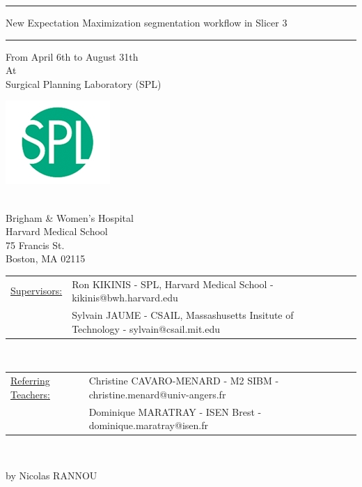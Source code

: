 \documentclass[a4paper,11pt]{report}
\begin{document}
\begin{titlepage}
\begin{center}
\bigskip
\bigskip
\bigskip
\bigskip

\hrule
\bigskip

\begin{minipage}{1\textwidth}
\begin{center}\begin{LARGE} 
New Expectation Maximization segmentation workflow in Slicer 3
\end{LARGE}\end{center}
\end{minipage}
\bigskip
\hrule

\bigskip
\bigskip
\bigskip

\begin{small}From April 6th to August 31th \\ 
At \\ 
Surgical Planning Laboratory (SPL)
\end{small}

\includegraphics[width=.3\textwidth]{Images/Logos/logo_spl.jpg}
\begin{small}\\Brigham \& Women's Hospital\\
 Harvard Medical School \\
 75 Francis St. \\
 Boston, MA 02115\end{small}
\end{center}
\bigskip

\vspace{0.5cm}
\begin{tabular}{*{2}ll}
\underline{Supervisors:} &Ron KIKINIS - SPL, Harvard Medical School - kikinis@bwh.harvard.edu\\
&Sylvain JAUME - CSAIL, Massashusetts Insitute of Technology - sylvain@csail.mit.edu\\
\end{tabular}
\vspace{0.5cm}\\
\begin{tabular}{*{2}l}
\underline{Referring Teachers:} &Christine CAVARO-MENARD - M2 SIBM - christine.menard@univ-angers.fr\\
&Dominique MARATRAY - ISEN Brest - dominique.maratray@isen.fr
\end{tabular}
\vspace{0.5cm}\\
\begin{flushright}by Nicolas RANNOU\end{flushright}

\end{titlepage}
\end{document}
